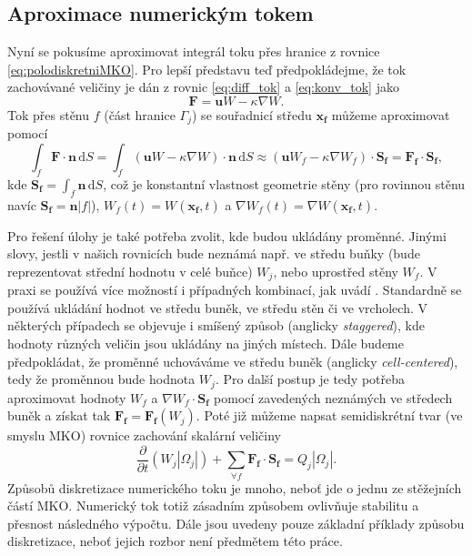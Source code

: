 \subsection{Aproximace numerickým tokem}

Nyní se pokusíme aproximovat integrál toku přes hranice z rovnice \ref{eq:polodiskretniMKO}. Pro lepší představu teď předpokládejme, že tok zachovávané veličiny je dán z rovnic \ref{eq:diff_tok} a \ref{eq:konv_tok} jako
\begin{equation}
\mathbf{F}=\mathbf{u}W-\kappa \nabla W.
\end{equation}
Tok přes stěnu $f$ (část hranice $\Gamma_j$) se souřadnicí středu $\mathbf{x_f}$ můžeme aproximovat pomocí
\begin{equation}\label{eq:aprox_tok}
\int_{f}\mathbf{F}\cdot \mathbf{n} \,\mathrm{d}S
=
\int_{f}(\mathbf{u}W-\kappa\nabla W)\cdot \mathbf{n}\, \mathrm{d}S 
\approx 
\left(\mathbf{u} W_f - \kappa \nabla W_f \right) \cdot \mathbf{S_f} 
= 
\mathbf{F_f} \cdot \mathbf{S_f},
\end{equation}
kde $\mathbf{S_f}=\int_{f}\mathbf{n}\,\mathrm{d}S$, což je konstantní vlastnost geometrie stěny (pro rovinnou stěnu navíc $\mathbf{S_f}=\mathbf{n}|f|$), $W_f(t) = W(\mathbf{x_f},t)$ a $\nabla W_f(t) = \nabla W (\mathbf{x_f}, t)$.

Pro řešení úlohy je také potřeba zvolit, kde budou ukládány proměnné. Jinými slovy, jestli v našich rovnicích bude neznámá např. ve středu buňky (bude reprezentovat střední hodnotu v celé buňce) $W_j$, nebo uprostřed stěny $W_f$. V praxi se používá více možností i případných kombinací, jak uvádí \cite{blazek2015computational, hirsch2007numerical}.
Standardně se používá ukládání hodnot ve středu buněk, ve středu stěn či ve vrcholech.
V některých případech se objevuje i smíšený způsob (anglicky \textit{staggered}), kde hodnoty různých veličin jsou ukládány na jiných místech.
Dále budeme předpokládat, že proměnné uchováváme ve středu buněk (anglicky \textit{cell-centered}), tedy že proměnnou bude hodnota $W_j$.
Pro další postup je tedy potřeba aproximovat hodnoty $W_f$ a $\nabla W_f \cdot \mathbf{S_f}$ pomocí zavedených neznámých ve středech buněk a získat tak $ \mathbf{F_f} = \mathbf{F_f}(W_j)$.
Poté již můžeme napsat semidiskrétní tvar (ve smyslu MKO) rovnice zachování skalární veličiny 
\begin{equation}
\frac{\partial}{\partial t} (W_j|\Omega_j|) + \sum_{\forall f} \mathbf{F_f} \cdot \mathbf{S_f} = Q_j|\Omega_j|.
\end{equation}
Způsobů diskretizace numerického toku je mnoho, neboť jde o jednu ze stěžejních částí MKO. Numerický tok totiž zásadním způsobem ovlivňuje stabilitu a přesnost následného výpočtu. Dále jsou uvedeny pouze základní příklady způsobu diskretizace, neboť jejich rozbor není předmětem této práce.

